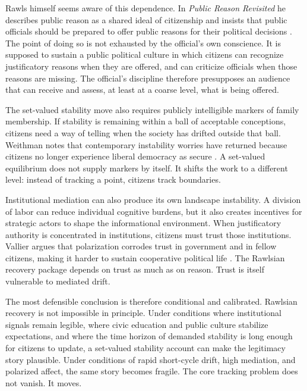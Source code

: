 \documentclass[12pt]{article}
\begin{document}
Rawls himself seems aware of this dependence. In \emph{Public Reason Revisited} he describes public reason as a shared ideal of citizenship and insists that public officials should be prepared to offer public reasons for their political decisions \parencite[p.~768]{rawls1997public}. The point of doing so is not exhausted by the official's own conscience. It is supposed to sustain a public political culture in which citizens can recognize justificatory reasons when they are offered, and can criticize officials when those reasons are missing. The official's discipline therefore presupposes an audience that can receive and assess, at least at a coarse level, what is being offered.


The set-valued stability move also requires publicly intelligible markers of family membership. If stability is remaining within a ball of acceptable conceptions, citizens need a way of telling when the society has drifted outside that ball. Weithman notes that contemporary instability worries have returned because citizens no longer experience liberal democracy as secure \parencite[p.~1187]{Weithman2024Rescuing}. A set-valued equilibrium does not supply markers by itself. It shifts the work to a different level: instead of tracking a point, citizens track boundaries.

Institutional mediation can also produce its own landscape instability. A division of labor can reduce individual cognitive burdens, but it also creates incentives for strategic actors to shape the informational environment. When justificatory authority is concentrated in institutions, citizens must trust those institutions. Vallier argues that polarization corrodes trust in government and in fellow citizens, making it harder to sustain cooperative political life \parencite[pp.~1, 3]{vallier2020trust}. The Rawlsian recovery package depends on trust as much as on reason. Trust is itself vulnerable to mediated drift.

The most defensible conclusion is therefore conditional and calibrated. Rawlsian recovery is not impossible in principle. Under conditions where institutional signals remain legible, where civic education and public culture stabilize expectations, and where the time horizon of demanded stability is long enough for citizens to update, a set-valued stability account can make the legitimacy story plausible. Under conditions of rapid short-cycle drift, high mediation, and polarized affect, the same story becomes fragile. The core tracking problem does not vanish. It moves.
\end{document}
